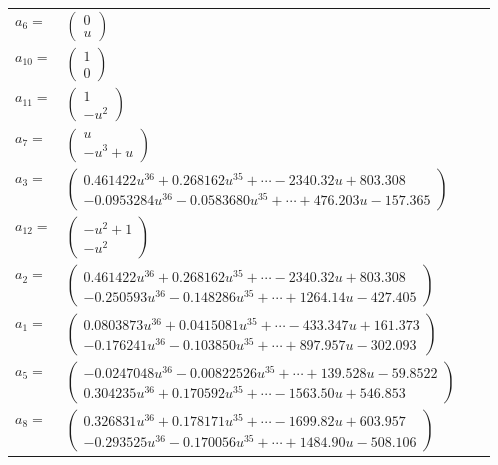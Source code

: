 \documentclass[1p]{elsarticle_modified}
\theoremstyle{definition}
\begin{document}
\begin{tabular}{m{7pt} m{180pt} m{7pt} m{180pt} }
\flushright $a_{6}=$&$\begin{pmatrix}0\\u\end{pmatrix}$ \\
\flushright $a_{10}=$&$\begin{pmatrix}1\\0\end{pmatrix}$ \\
\flushright $a_{11}=$&$\begin{pmatrix}1\\- u^2\end{pmatrix}$ \\
\flushright $a_{7}=$&$\begin{pmatrix}u\\- u^3+u\end{pmatrix}$ \\
\flushright $a_{3}=$&$\begin{pmatrix}0.461422 u^{36}+0.268162 u^{35}+\cdots-2340.32 u+803.308\\-0.0953284 u^{36}-0.0583680 u^{35}+\cdots+476.203 u-157.365\end{pmatrix}$ \\
\flushright $a_{12}=$&$\begin{pmatrix}- u^2+1\\- u^2\end{pmatrix}$ \\
\flushright $a_{2}=$&$\begin{pmatrix}0.461422 u^{36}+0.268162 u^{35}+\cdots-2340.32 u+803.308\\-0.250593 u^{36}-0.148286 u^{35}+\cdots+1264.14 u-427.405\end{pmatrix}$ \\
\flushright $a_{1}=$&$\begin{pmatrix}0.0803873 u^{36}+0.0415081 u^{35}+\cdots-433.347 u+161.373\\-0.176241 u^{36}-0.103850 u^{35}+\cdots+897.957 u-302.093\end{pmatrix}$ \\
\flushright $a_{5}=$&$\begin{pmatrix}-0.0247048 u^{36}-0.00822526 u^{35}+\cdots+139.528 u-59.8522\\0.304235 u^{36}+0.170592 u^{35}+\cdots-1563.50 u+546.853\end{pmatrix}$ \\
\flushright $a_{8}=$&$\begin{pmatrix}0.326831 u^{36}+0.178171 u^{35}+\cdots-1699.82 u+603.957\\-0.293525 u^{36}-0.170056 u^{35}+\cdots+1484.90 u-508.106\end{pmatrix}$ \\

\end{tabular}
\end{document}
